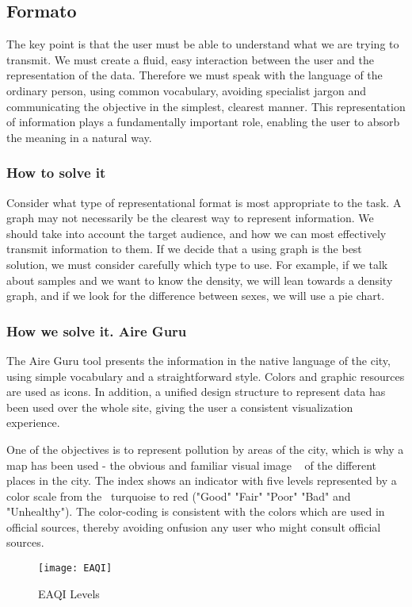\subsection{Formato}
The key point is that the user must be able to understand what we are trying to transmit. We must create a fluid, easy interaction between the user and the representation of the data. Therefore we must speak with the language of the ordinary person, using common vocabulary, avoiding specialist jargon and communicating the objective in the simplest, clearest manner. This representation of information plays a fundamentally important role, enabling the user to absorb the meaning in a natural way.



\subsubsection{How to solve it} 
Consider what type of representational format is most appropriate to the task. A graph may not necessarily be the clearest way to represent information.
We should take into account the target audience, and how we can most effectively transmit information to them. If we decide that a using graph is the best solution, we must consider carefully which type to use. For example, if we talk about samples and we want to know the density, we will lean towards a density graph, and if we look for the difference
between sexes, we will use a pie chart.

\subsubsection{How we solve it. Aire Guru} 
The Aire Guru tool presents the information in the native language of the city, using simple vocabulary and a straightforward style.
Colors and graphic resources are used as icons. In addition, a unified design structure to represent data has been used over the whole site, giving the user a consistent visualization experience. 

One of the objectives is to represent pollution by areas of the city, which is why a map has been used - the obvious and familiar visual image
  of the different places in the city. The index shows an indicator with five levels represented by a color scale from the
 turquoise to red ("Good" "Fair" "Poor" "Bad" and "Unhealthy"). The color-coding is consistent with the colors which are used in official sources, thereby avoiding onfusion any user who might consult official sources.
 \newpage
 \begin{figure}[ht]
    \centering
    \texttt{[image: EAQI]}
    \caption{EAQI Levels}
\end{figure}

